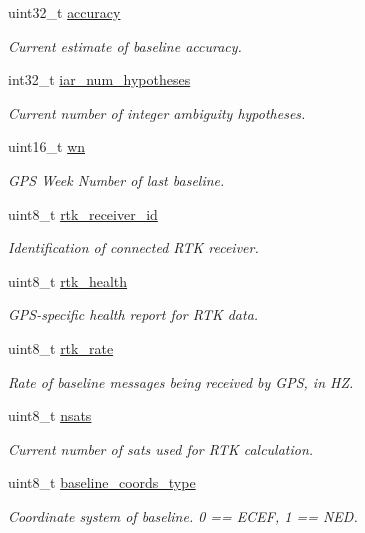 \begin{DoxyCompactItemize}
uint32\+\_\+t \hyperlink{struct____mavlink__gps2__rtk__t_a342d3d2172791e25e40b9c18f9519929}{accuracy}
\begin{DoxyCompactList}\small\item\em Current estimate of baseline accuracy. \end{DoxyCompactList}\item 
int32\+\_\+t \hyperlink{struct____mavlink__gps2__rtk__t_a23b98c19d6cf75f0914491b11aa50c2f}{iar\+\_\+num\+\_\+hypotheses}
\begin{DoxyCompactList}\small\item\em Current number of integer ambiguity hypotheses. \end{DoxyCompactList}\item 
uint16\+\_\+t \hyperlink{struct____mavlink__gps2__rtk__t_ab1cbe4fe65cb2ad775c9c47317e9b04b}{wn}
\begin{DoxyCompactList}\small\item\em G\+P\+S Week Number of last baseline. \end{DoxyCompactList}\item 
uint8\+\_\+t \hyperlink{struct____mavlink__gps2__rtk__t_abae1e17d351ebd96bb155c3843fb5ee5}{rtk\+\_\+receiver\+\_\+id}
\begin{DoxyCompactList}\small\item\em Identification of connected R\+T\+K receiver. \end{DoxyCompactList}\item 
uint8\+\_\+t \hyperlink{struct____mavlink__gps2__rtk__t_a44ed802f870c5ec089e46c9d8a732b46}{rtk\+\_\+health}
\begin{DoxyCompactList}\small\item\em G\+P\+S-\/specific health report for R\+T\+K data. \end{DoxyCompactList}\item 
uint8\+\_\+t \hyperlink{struct____mavlink__gps2__rtk__t_ad9801921d6a4e409f0d3d9d796a7b1c4}{rtk\+\_\+rate}
\begin{DoxyCompactList}\small\item\em Rate of baseline messages being received by G\+P\+S, in H\+Z. \end{DoxyCompactList}\item 
uint8\+\_\+t \hyperlink{struct____mavlink__gps2__rtk__t_a8b763c1a2f4b06532c12a5072967bb33}{nsats}
\begin{DoxyCompactList}\small\item\em Current number of sats used for R\+T\+K calculation. \end{DoxyCompactList}\item 
uint8\+\_\+t \hyperlink{struct____mavlink__gps2__rtk__t_ac23c4ab684fc2cfeaaa508ef703ea1ad}{baseline\+\_\+coords\+\_\+type}
\begin{DoxyCompactList}\small\item\em Coordinate system of baseline. 0 == E\+C\+E\+F, 1 == N\+E\+D. \end{DoxyCompactList}\end{DoxyCompactItemize}


